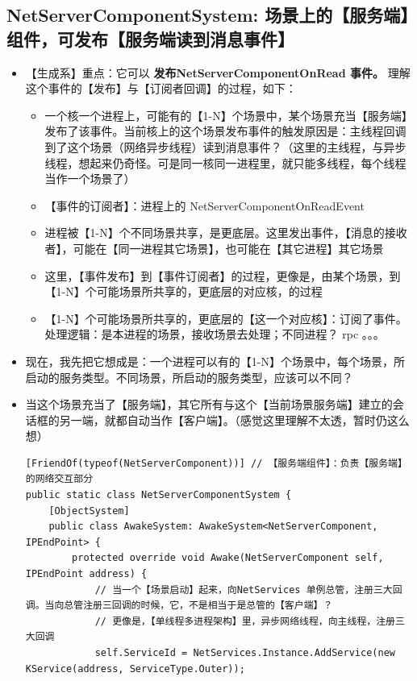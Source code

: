 \documentclass[9pt, b5paper]{article}
\begin{document}
\subsection{NetServerComponentSystem: 场景上的【服务端】组件，可发布【服务端读到消息事件】}
\label{sec-3-4}
\begin{itemize}
\item 【生成系】重点：它可以 \textbf{发布NetServerComponentOnRead 事件。} 理解这个事件的【发布】与【订阅者回调】的过程，如下：
\begin{itemize}
\item 一个核一个进程上，可能有的【1-N】个场景中，某个场景充当【服务端】发布了该事件。当前核上的这个场景发布事件的触发原因是：主线程回调到了这个场景（网络异步线程）读到消息事件？（这里的主线程，与异步线程，想起来仍奇怪。可是同一核同一进程里，就只能多线程，每个线程当作一个场景了）
\item 【事件的订阅者】：进程上的 NetServerComponentOnReadEvent
\item 进程被【1-N】个不同场景共享，是更底层。这里发出事件，【消息的接收者】，可能在【同一进程其它场景】，也可能在【其它进程】其它场景
\item 这里，【事件发布】到【事件订阅者】的过程，更像是，由某个场景，到【1-N】个可能场景所共享的，更底层的对应核，的过程
\item 【1-N】个可能场景所共享的，更底层的【这一个对应核】：订阅了事件。处理逻辑：是本进程的场景，接收场景去处理；不同进程？ rpc 。。。
\end{itemize}
\item 现在，我先把它想成是：一个进程可以有的【1-N】个场景中，每个场景，所启动的服务类型。不同场景，所启动的服务类型，应该可以不同？
\item 当这个场景充当了【服务端】，其它所有与这个【当前场景服务端】建立的会话框的另一端，就都自动当作【客户端】。（感觉这里理解不太透，暂时仍这么想）
\begin{verbatim}
[FriendOf(typeof(NetServerComponent))] // 【服务端组件】：负责【服务端】的网络交互部分
public static class NetServerComponentSystem {
    [ObjectSystem]
    public class AwakeSystem: AwakeSystem<NetServerComponent, IPEndPoint> {
        protected override void Awake(NetServerComponent self, IPEndPoint address) {
            // 当一个【场景启动】起来，向NetServices 单例总管，注册三大回调。当向总管注册三回调的时候，它，不是相当于是总管的【客户端】？
            // 更像是，【单线程多进程架构】里，异步网络线程，向主线程，注册三大回调
            self.ServiceId = NetServices.Instance.AddService(new KService(address, ServiceType.Outer));

\end{verbatim}
\end{itemize}
\end{document}
